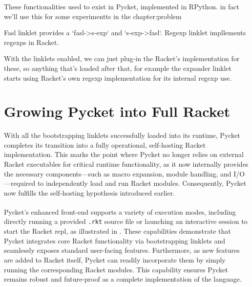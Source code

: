 			\begin{paragraph-here}%
				These functionalities used to exist in Pycket, implemented in RPython. in fact we'll use this for some experimentts in the chapter:problem
			\end{paragraph-here}

			\begin{paragraph-here}%
				Fasl linklet provides a `fasl->s-exp` and `s-exp->fasl`. Regexp linklet impllements regexps in Racket.
			\end{paragraph-here}

			\begin{paragraph-here}%
				With the linklets enabled, we can just plug-in the Racket's implementation for these, so anything that's loaded after that, for example the expander linklet starts using Racket's own regexp implementation for its internal regexp use.
			\end{paragraph-here}

	\section[\texorpdfstring{Growing Pycket into Full Racket}{Pycket as Full Racket}]{Growing Pycket into Full Racket}


		\paragraph{}%
			With all the bootstrapping linklets successfully loaded into its runtime, Pycket completes its transition into a fully operational, self-hosting Racket implementation. This marks the point where Pycket no longer relies on external Racket executables for critical runtime functionality, as it now internally provides the necessary components—such as macro expansion, module handling, and I/O—required to independently load and run Racket modules. Consequently, Pycket now fulfills the self-hosting hypothesis introduced earlier.

		\paragraph{}%
			Pycket's enhanced front-end supports a variety of execution modes, including directly running a provided \texttt{.rkt} source file or launching an interactive session to start the Racket \gls{repl}, as illustrated in . These capabilities demonstrate that Pycket integrates core Racket functionality via bootstrapping linklets and seamlessly exposes standard user-facing features. Furthermore, as new features are added to Racket itself, Pycket can readily incorporate them by simply running the corresponding Racket modules. This capability ensures Pycket remains robust and future-proof as a complete implementation of the language.

